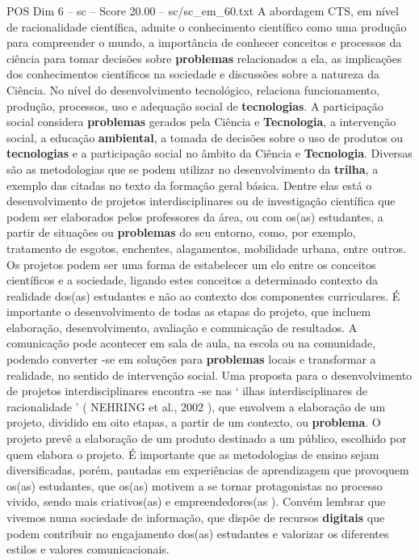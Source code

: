 \begin{textsample}{POS Dim 6 – sc – Score 20.00 – sc/sc\_em\_60.txt}
A abordagem CTS, em nível de racionalidade científica, admite o conhecimento científico como uma produção para compreender o mundo, a importância de conhecer conceitos e processos da ciência para tomar decisões sobre \textbf{problemas} relacionados a ela, as implicações dos conhecimentos científicos na sociedade e discussões sobre a natureza da Ciência.
No nível do desenvolvimento tecnológico, relaciona funcionamento, produção, processos, uso e adequação social de \textbf{tecnologias}.
A participação social considera \textbf{problemas} gerados pela Ciência e \textbf{Tecnologia}, a intervenção social, a educação \textbf{ambiental}, a tomada de decisões sobre o uso de produtos ou \textbf{tecnologias} e a participação social no âmbito da Ciência e \textbf{Tecnologia}.
Diversas são as metodologias que se podem utilizar no desenvolvimento da \textbf{trilha}, a exemplo das citadas no texto da formação geral básica.
Dentre elas está o desenvolvimento de projetos interdisciplinares ou de investigação científica que podem ser elaborados pelos professores da área, ou com os(as) estudantes, a partir de situações ou \textbf{problemas} do seu entorno, como, por exemplo, tratamento de esgotos, enchentes, alagamentos, mobilidade urbana, entre outros.
Os projetos podem ser uma forma de estabelecer um elo entre os conceitos científicos e a sociedade, ligando estes conceitos a determinado contexto da realidade dos(as) estudantes e não ao contexto dos componentes curriculares.
É importante o desenvolvimento de todas as etapas do projeto, que incluem elaboração, desenvolvimento, avaliação e comunicação de resultados.
A comunicação pode acontecer em sala de aula, na escola ou na comunidade, podendo converter -se em soluções para \textbf{problemas} locais e transformar a realidade, no sentido de intervenção social.
Uma proposta para o desenvolvimento de projetos interdisciplinares encontra -se nas ‘ ilhas interdisciplinares de racionalidade ’ ( NEHRING et al., 2002 ), que envolvem a elaboração de um projeto, dividido em oito etapas, a partir de um contexto, ou \textbf{problema}.
O projeto prevê a elaboração de um produto destinado a um público, escolhido por quem elabora o projeto.
É importante que as metodologias de ensino sejam diversificadas, porém, pautadas em experiências de aprendizagem que provoquem os(as) estudantes, que os(as) motivem a se tornar protagonistas no processo vivido, sendo mais criativos(as) e empreendedores(as ).
Convém lembrar que vivemos numa sociedade de informação, que dispõe de recursos \textbf{digitais} que podem contribuir no engajamento dos(as) estudantes e valorizar os diferentes estilos e valores comunicacionais.

\end{textsample}

